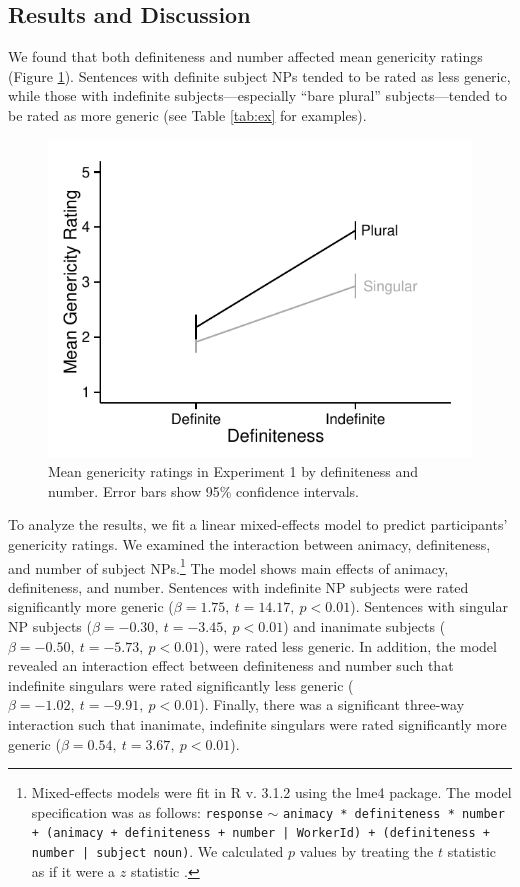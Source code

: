 \documentclass[10pt,letterpaper]{article}
\begin{document}
\subsection{Results and Discussion}

We found that both definiteness and number affected mean genericity ratings (Figure \ref{fig:e1}). Sentences with definite subject NPs tended to be rated as less generic, while those with indefinite subjects---especially ``bare plural'' subjects---tended to be rated as more generic (see Table \ref{tab:ex} for examples).

\begin{figure}[t]
\centering
\includegraphics[width=.8\linewidth]{figures/e1.pdf}
\caption{\label{fig:e1} Mean genericity ratings in Experiment 1 by definiteness and number. Error bars show 95\% confidence intervals.} 
\end{figure}

To analyze the results, we fit a linear mixed-effects model to predict participants' genericity ratings. We examined the interaction between animacy, definiteness, and number of subject NPs.\footnote{Mixed-effects models were fit in R v. 3.1.2 using the lme4 package. The model specification was as follows: \texttt{response} \(\sim\) \texttt{animacy * definiteness * number + (animacy + definiteness + number | WorkerId) + (definiteness + number | subject noun)}. We calculated \(p\) values by treating the \(t\) statistic as if it were a \(z\) statistic \cite{Barr:2013}.} The model shows main effects of animacy, definiteness, and number. Sentences with indefinite NP subjects were rated significantly more generic (\(\beta = 1.75,~t = 14.17,~p < 0.01\)). Sentences with singular NP subjects (\(\beta = -0.30,~t = -3.45,~p < 0.01\)) and inanimate subjects (\(\beta = -0.50,~t = -5.73,~p < 0.01\)), were rated less generic. In addition, the model revealed an interaction effect between definiteness and number such that indefinite singulars were rated significantly less generic (\(\beta = -1.02,~t = -9.91,~p < 0.01\)). Finally, there was a significant three-way interaction such that inanimate, indefinite singulars were rated significantly more generic (\(\beta = 0.54,~t = 3.67,~p < 0.01\)). 
\end{document}
